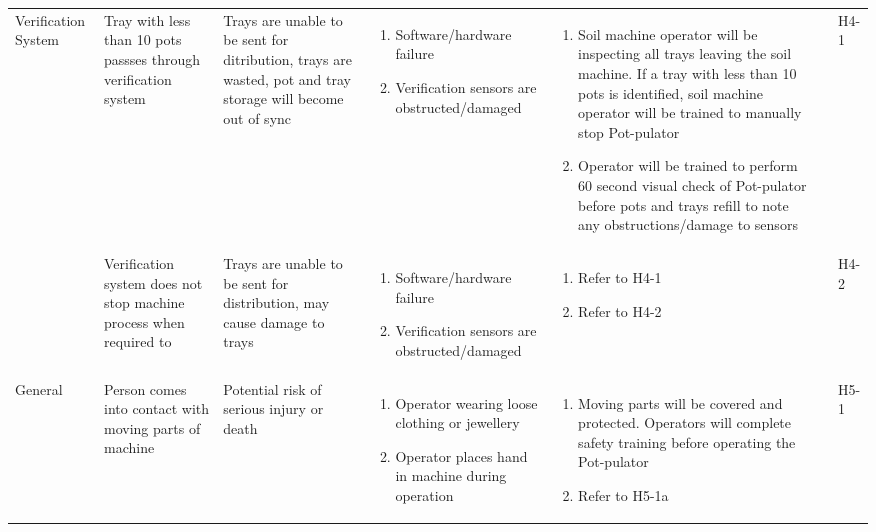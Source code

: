 \documentclass{article}
\begin{document}
\begin{landscape}
\begin{center}
\begin{longtable}{|l|  p{3cm}  p{4cm}  p{4cm}  p{4cm}  p{1cm}  p{1cm}|}
        Verification System&
        Tray with less than 10 pots passses through verification system&
        Trays are unable to be sent for ditribution, trays are wasted, pot and tray storage will become out of sync&
        \begin{enumerate}[label=(\alph*)]
            \item Software/hardware failure
            \item Verification sensors are obstructed/damaged
        \end{enumerate}&
        \begin{enumerate}[label=(\alph*)]
            \item Soil machine operator will be inspecting all trays leaving the soil machine. If a tray with less than 10 pots is identified, soil machine operator will be trained to manually stop Pot-pulator
            \item Operator will be trained to perform 60 second visual check of Pot-pulator before pots and trays refill to note any obstructions/damage to sensors
        \end{enumerate}&
        &
        H4-1\\

        &
        Verification system does not stop machine process when required to&
        Trays are unable to be sent for distribution, may cause damage to trays&
        \begin{enumerate}[label=(\alph*)]
            \item Software/hardware failure
            \item Verification sensors are obstructed/damaged
        \end{enumerate}&
        \begin{enumerate}[label=(\alph*)]
            \item Refer to H4-1
            \item Refer to H4-2
        \end{enumerate}&
        &
        H4-2\\

        \hline

        General&
        Person comes into contact with moving parts of machine&
        Potential risk of serious injury or death&
        \begin{enumerate}[label=(\alph*)]
            \item Operator wearing loose clothing or jewellery
            \item Operator places hand in machine during operation
        \end{enumerate}&
        \begin{enumerate}[label=(\alph*)]
            \item Moving parts will be covered and protected. Operators will complete safety training before operating the Pot-pulator
            \item Refer to H5-1a
        \end{enumerate}&
        &
        H5-1\\


\end{longtable}
\end{center}
\end{landscape}
\end{document}
